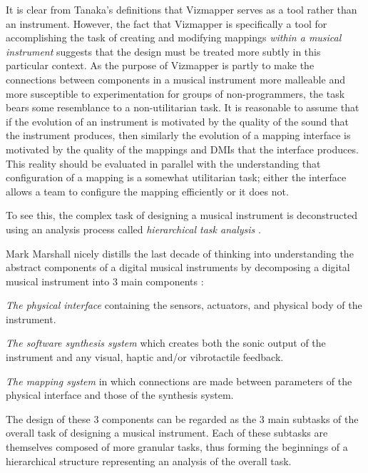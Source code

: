 It is clear from Tanaka's definitions that Vizmapper serves as a tool rather than an instrument. However, the fact that Vizmapper is specifically a tool for accomplishing the task of creating and modifying mappings \emph{within a musical instrument} suggests that the design must be treated more subtly in this particular context. As the purpose of Vizmapper is partly to make the connections between components in a musical instrument more malleable and more susceptible to experimentation for groups of non-programmers, the task bears some resemblance to a non-utilitarian task. It is reasonable to assume that if the evolution of an instrument is motivated by the quality of the sound that the instrument produces, then similarly the evolution of a mapping interface is motivated by the quality of the mappings and DMIs that the interface produces. This reality should be evaluated in parallel with the understanding that configuration of a mapping is a somewhat utilitarian task; either the interface allows a team to configure the mapping efficiently or it does not.

To see this, the complex task of designing a musical instrument is deconstructed using an analysis process called \emph{hierarchical task analysis} \cite{annett1967}. 

Mark Marshall nicely distills the last decade of thinking into understanding the abstract components of a digital musical instruments by decomposing a digital musical instrument into 3 main components \cite{marshall2008}:

\begin{description}
\item \emph{The physical interface} containing the sensors, actuators, and physical body of the instrument.
\item \emph{The software synthesis system} which creates both the sonic output of the instrument and any visual, haptic and/or vibrotactile feedback.
\item \emph{The mapping system} in which connections are made between parameters of the physical interface and those of the synthesis system.
\end{description}

The design of these 3 components can be regarded as the 3 main subtasks of the overall task of designing a musical instrument. Each of these subtasks are themselves composed of more granular tasks, thus forming the beginnings of a hierarchical structure representing an analysis of the overall task.


